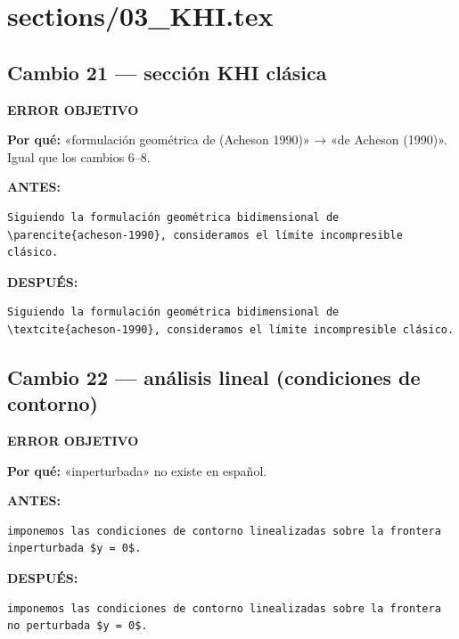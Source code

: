 \documentclass[11pt,a4paper]{article}
\begin{document}
\section*{sections/03\_KHI.tex}
\subsection*{Cambio 21 --- sección KHI clásica}
\colorbox{okbg}{\textbf{\footnotesize ERROR OBJETIVO}}

\textbf{Por qué:} «formulación geométrica de (Acheson 1990)» → «de Acheson (1990)». Igual que los cambios 6--8.

\textcolor{antesline}{\textbf{ANTES:}}
\begin{Verbatim}[breaklines=true, breakanywhere=true, fontsize=\small, frame=leftline, rulecolor=\color{antesline}, framerule=1.2pt]
Siguiendo la formulación geométrica bidimensional de \parencite{acheson-1990}, consideramos el límite incompresible clásico.
\end{Verbatim}
\textcolor{despline}{\textbf{DESPUÉS:}}
\begin{Verbatim}[breaklines=true, breakanywhere=true, fontsize=\small, frame=leftline, rulecolor=\color{despline}, framerule=1.2pt]
Siguiendo la formulación geométrica bidimensional de \textcite{acheson-1990}, consideramos el límite incompresible clásico.
\end{Verbatim}

\subsection*{Cambio 22 --- análisis lineal (condiciones de contorno)}
\colorbox{okbg}{\textbf{\footnotesize ERROR OBJETIVO}}

\textbf{Por qué:} «inperturbada» no existe en español.

\textcolor{antesline}{\textbf{ANTES:}}
\begin{Verbatim}[breaklines=true, breakanywhere=true, fontsize=\small, frame=leftline, rulecolor=\color{antesline}, framerule=1.2pt]
imponemos las condiciones de contorno linealizadas sobre la frontera inperturbada $y = 0$.
\end{Verbatim}
\textcolor{despline}{\textbf{DESPUÉS:}}
\begin{Verbatim}[breaklines=true, breakanywhere=true, fontsize=\small, frame=leftline, rulecolor=\color{despline}, framerule=1.2pt]
imponemos las condiciones de contorno linealizadas sobre la frontera no perturbada $y = 0$.
\end{Verbatim}
\end{document}
